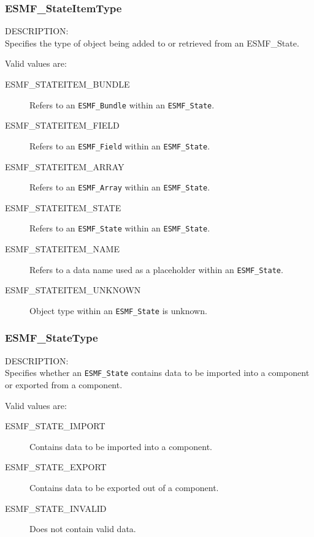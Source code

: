 
\subsubsection{ESMF\_StateItemType}
\label{opt:stateitem}

{\sf DESCRIPTION:\\}
Specifies the type of object being added to or retrieved from an
{ESMF\_State.}

Valid values are:
\begin{description}
   \item [ESMF\_STATEITEM\_BUNDLE] 
         Refers to an {\tt ESMF\_Bundle} within an {\tt ESMF\_State}.
   \item [ESMF\_STATEITEM\_FIELD]
         Refers to an {\tt ESMF\_Field} within an {\tt ESMF\_State}.
   \item [ESMF\_STATEITEM\_ARRAY]
         Refers to an {\tt ESMF\_Array} within an {\tt ESMF\_State}.
   \item [ESMF\_STATEITEM\_STATE]
         Refers to an {\tt ESMF\_State} within an {\tt ESMF\_State}.
   \item [ESMF\_STATEITEM\_NAME]
         Refers to a data name used as a placeholder within 
         an {\tt ESMF\_State}.
   \item [ESMF\_STATEITEM\_UNKNOWN]
         Object type within an {\tt ESMF\_State} is unknown.
\end{description}

\subsubsection{ESMF\_StateType}
\label{opt:statetype}
{\sf DESCRIPTION:\\}
Specifies whether an {\tt ESMF\_State} contains data to be imported
into a component or exported from a component. 

Valid values are:
\begin{description}
   \item [ESMF\_STATE\_IMPORT] 
         Contains data to be imported into a component.
   \item [ESMF\_STATE\_EXPORT]
         Contains data to be exported out of a component.
   \item [ESMF\_STATE\_INVALID]
         Does not contain valid data.
\end{description}














